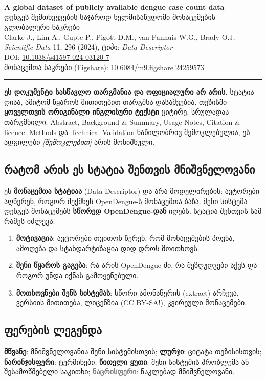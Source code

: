 \documentclass[11pt,a4paper]{article}
\newcommand{\imp}[1]{\textbf{\color{importred}#1}}
\begin{document}
\begin{center}
  {\Large\bfseries A global dataset of publicly available dengue case count data}\\[0.6em]
  {\large დენგეს შემთხვევების საჯაროდ ხელმისაწვდომი მონაცემების გლობალური ნაკრები}\\[0.8em]
  Clarke J., Lim A., Gupte P., Pigott D.M., van Panhuis W.G., Brady O.J.\\
  \textit{Scientific Data} 11, 296 (2024), ტიპი: \textit{Data Descriptor}\\
  DOI: \href{https://doi.org/10.1038/s41597-024-03120-7}{10.1038/s41597-024-03120-7}\\
  მონაცემთა ნაკრები (Figshare): \href{https://doi.org/10.6084/m9.figshare.24259573}{10.6084/m9.figshare.24259573}
\end{center}

\noindent\rule{\linewidth}{0.4pt}

\noindent\textbf{ეს დოკუმენტი სასწავლო თარგმანია და ოფიციალური არ არის.} სტატია ღიაა, ამიტომ წყაროს მითითებით თარგმნა დასაშვებია.
თეზისში \imp{ყოველთვის ორიგინალი ინგლისური ტექსტი} ციტირე. სრულადაა თარგმნილი: Abstract, Background \& Summary,
Usage Notes, Citation \& licence. Methods და Technical Validation ნაწილობრივ შემოკლებულია, ეს ადგილები \textit{[შემოკლებით]} არის მონიშნული.

\subsection*{რატომ არის ეს სტატია შენთვის მნიშვნელოვანი}
ეს \textbf{მონაცემთა სტატიაა} (Data Descriptor) და არა მოდელირების: ავტორები აღწერენ, როგორ შექმნეს OpenDengue-ს მონაცემთა ბაზა.
შენი სისტემა დენგეს მონაცემებს \imp{სწორედ OpenDengue-დან} იღებს. სტატია შენთვის სამ რამეს იძლევა:
\begin{enumerate}[leftmargin=1.5em]
  \item \textbf{მოტივაცია}: ავტორები თვითონ წერენ, რომ მონაცემების პოვნა, ამოღება და სტანდარტიზაცია დიდ დროს მოითხოვს.
  \item \textbf{შენი წყაროს გაგება}: რა არის OpenDengue-ში, რა შეზღუდვები აქვს და როგორ უნდა იქნას გამოყენებული.
  \item \textbf{მოთხოვნები შენს სისტემას}: სწორი ამონაწერის (extract) არჩევა, ვერსიის მითითება, ლიცენზია (CC BY-SA!), კვირეული მონაცემები.
\end{enumerate}

\subsection*{ფერების ლეგენდა}
\textcolor{brandgreen}{\textbf{მწვანე}}: მნიშვნელოვანია შენი სისტემისთვის;
\textcolor{quoteblue}{\textbf{ლურჯი}}: ციტატა თეზისისთვის;
\textcolor{termorange}{\textbf{ნარინჯისფერი}}: ტერმინები;
\textcolor{importred}{\textbf{წითელი ყუთი}}: შენი სისტემის პრობლემა ან შესამოწმებელი საკითხი;
\textcolor{gray}{\textbf{ნაცრისფერი}}: ნაკლებად მნიშვნელოვანი.
\end{document}
